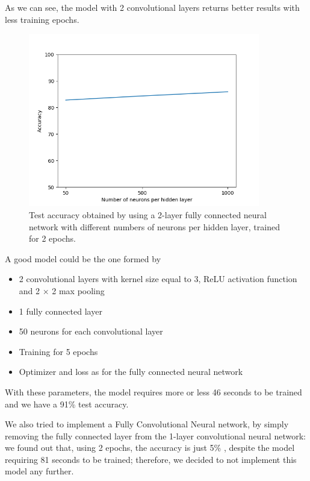 \documentclass[12pt]{article}
\begin{document}
As we can see, the model with 2 convolutional layers returns better results with less training epochs.

\begin{figure}[h!]
	\centering
	\includegraphics[width = 0.9\textwidth]{ex3_CNN2l_accuracy-neurons.png}
	\caption{Test accuracy obtained by using a 2-layer fully connected neural network with different numbers of neurons per hidden layer, trained for 2 epochs.}
	\label{fig:ex3_CNN_neurons}
\end{figure}

A good model could be the one formed by 
\begin{itemize}
	\item 2 convolutional layers with kernel size equal to 3, ReLU activation function and 2 $\times$ 2 max pooling
	\item 1 fully connected layer
	\item 50 neurons for each convolutional layer
	\item Training for 5 epochs
	\item Optimizer and loss as for the fully connected neural network
\end{itemize}

With these parameters, the model requires more or less 46 seconds to be trained and we have a 91\% test accuracy.\newline

We also tried to implement a Fully Convolutional Neural network, by simply removing the fully connected layer from the 1-layer convolutional neural network: we found out that, using 2 epochs, the accuracy is just 5\% , despite the model requiring 81 seconds to be trained; therefore, we decided to not implement this model any further.
\end{document}

